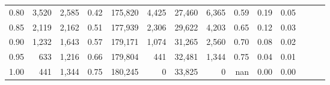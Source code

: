 \begin{tabular}{rrrrrrrrrrrrrr}
0.80 &   3,520 &  2,585 &  0.42 &  175,820 &    4,425 &  27,460 &   6,365 &  0.59 &  0.19 &      0.05 \\
0.85 &   2,119 &  2,162 &  0.51 &  177,939 &    2,306 &  29,622 &   4,203 &  0.65 &  0.12 &      0.03 \\
0.90 &   1,232 &  1,643 &  0.57 &  179,171 &    1,074 &  31,265 &   2,560 &  0.70 &  0.08 &      0.02 \\
0.95 &     633 &  1,216 &  0.66 &  179,804 &      441 &  32,481 &   1,344 &  0.75 &  0.04 &      0.01 \\
1.00 &     441 &  1,344 &  0.75 &  180,245 &        0 &  33,825 &       0 &   nan &  0.00 &      0.00 \\
\bottomrule
\end{tabular}
